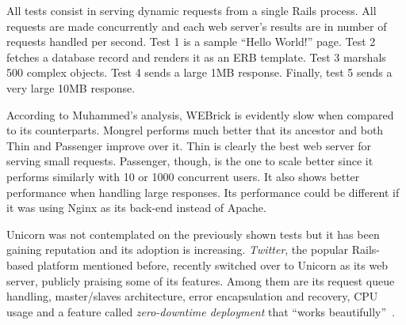 All tests consist in serving dynamic requests from a single Rails process. All requests are made concurrently and each web server's results are in number of requests handled per second. Test 1 is a sample ``Hello World!'' page. Test 2 fetches a database record and renders it as an ERB template. Test 3 marshals 500 complex objects. Test 4 sends a large 1MB response. Finally, test 5 sends a very large 10MB response.

According to Muhammed's analysis, WEBrick is evidently slow when compared to its counterparts. Mongrel performs much better that its ancestor and both Thin and Passenger improve over it. Thin is clearly the best web server for serving small requests. Passenger, though, is the one to scale better since it performs similarly with 10 or 1000 concurrent users. It also shows better performance when handling large responses. Its performance could be different if it was using Nginx as its back-end instead of Apache.

Unicorn was not contemplated on the previously shown tests but it has been gaining reputation and its adoption is increasing. \textit{Twitter}, the popular Rails-based platform mentioned before, recently switched over to Unicorn as its web server, publicly praising some of its features. Among them are its request queue handling, master/slaves architecture, error encapsulation and recovery, CPU usage and a feature called \textit{zero-downtime deployment} that ``works beautifully''~\cite{twitter_unicorn}.

